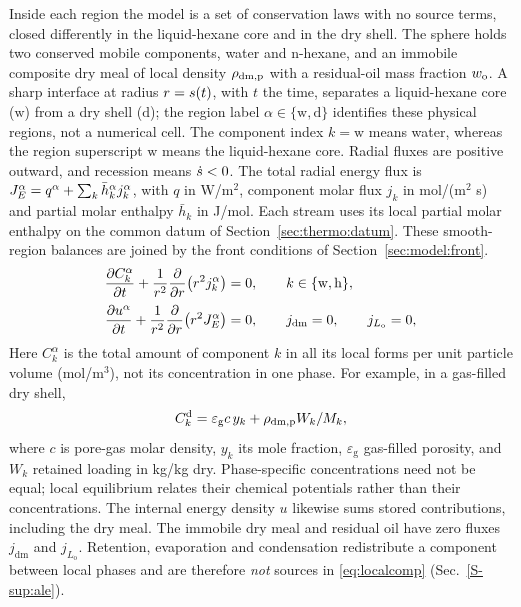 Inside each region the model is a set of conservation laws with no source
terms, closed differently in the liquid-hexane core and in the dry shell. The sphere
holds two conserved mobile components, water and n-hexane, and an immobile
composite dry meal of local density $\rho_{\mathrm{dm,p}}$ with a residual-oil mass
fraction $w_{\mathrm{o}}$. A sharp interface at radius $r=s(t)$, with $t$ the time,
separates a liquid-hexane core ($\mathrm{w}$) from a dry shell ($\mathrm{d}$); the
region label $\alpha\in\{\mathrm{w},\mathrm{d}\}$ identifies these physical
regions, not a numerical cell. The component index $k=\mathrm{w}$ means
water, whereas the region superscript $\mathrm{w}$ means the liquid-hexane core.
Radial fluxes are positive outward, and recession means $\dot{s}<0$.
The total radial energy flux is
$J_{E}^{\alpha}=q^{\alpha}+\sum_k\bar h_k^{\alpha}j_k^{\alpha}$,
with $q$ in W/m$^2$, component molar flux $j_k$ in mol/(m$^2$ s) and
partial molar enthalpy $\bar h_k$ in J/mol. Each stream uses its local partial molar enthalpy on the common datum
of Section~\ref{sec:thermo:datum}. These smooth-region balances are joined
by the front conditions of Section~\ref{sec:model:front}.
\begin{align}
\frac{\partial C_{k}^{\alpha}}{\partial t}
 + \frac{1}{r^{2}}\frac{\partial}{\partial r}\!\left(r^{2} j_{k}^{\alpha}\right)
 &= 0, \qquad k \in \{\mathrm{w},\mathrm{h}\},
\label{eq:localcomp}\\[2pt]
\frac{\partial u^{\alpha}}{\partial t}
 + \frac{1}{r^{2}}\frac{\partial}{\partial r}\!\left(r^{2} J_{E}^{\alpha}\right)
 &= 0,
\qquad j_{\mathrm{dm}} = 0, \qquad j_{L_{\mathrm{o}}} = 0 ,
\label{eq:localenergy}
\end{align}
Here $C_k^\alpha$ is the total amount of component $k$ in all its local
forms per unit particle volume (mol/m$^3$), not its concentration in one
phase. For example, in a gas-filled dry shell,
\begin{equation}
C_k^{\mathrm d}=\varepsilon_{\mathrm g}c\,y_k+\rho_{\mathrm{dm,p}} W_k/M_k,
\label{eq:drystorage}
\end{equation}
where $c$ is pore-gas molar density, $y_k$ its mole fraction,
$\varepsilon_{\mathrm g}$ gas-filled porosity, and $W_k$ retained loading
in kg/kg dry. Phase-specific concentrations need not be equal; local
equilibrium relates their chemical potentials rather than their concentrations.
The internal energy density $u$ likewise sums stored contributions,
including the dry meal. The immobile dry meal and residual oil have zero
fluxes $j_{\mathrm{dm}}$ and $j_{L_{\mathrm{o}}}$.
Retention,
evaporation and condensation redistribute a component between local phases and
are therefore \emph{not} sources in \eqref{eq:localcomp}
(Sec.~\ref*{S-sup:ale}).

